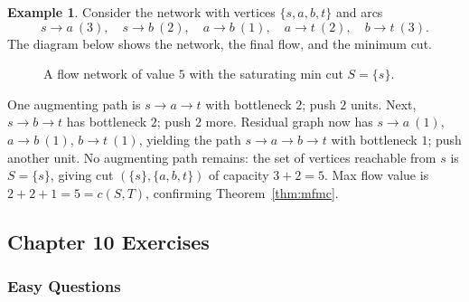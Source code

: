 \documentclass{article}
\theoremstyle{definition}
\newtheorem{example}{Example}
\begin{document}
\begin{example}
Consider the network with vertices $\{s, a, b, t\}$ and arcs
\[
  s \to a\ (3),\quad s \to b\ (2),\quad
  a \to b\ (1),\quad a \to t\ (2),\quad b \to t\ (3).
\]
The diagram below shows the network, the final flow, and the
minimum cut.

\begin{figure}[ht]
\centering
{}
\caption{A flow network of value $5$ with the saturating min cut $S = \{s\}$.}
\label{fig:mfmc-example}
\end{figure}

One augmenting path is $s \to a \to t$ with bottleneck $2$; push $2$
units. Next, $s \to b \to t$ has bottleneck $2$; push $2$ more.
Residual graph now has $s \to a\ (1)$, $a \to b\ (1)$, $b \to t\ (1)$,
yielding the path $s \to a \to b \to t$ with bottleneck $1$; push
another unit. No augmenting path remains: the set of vertices
reachable from $s$ is $S = \{s\}$, giving cut $(\{s\}, \{a, b, t\})$
of capacity $3 + 2 = 5$. Max flow value is $2 + 2 + 1 = 5 = c(S, T)$,
confirming Theorem~\ref{thm:mfmc}.
\end{example}

\subsection{Chapter 10 Exercises}

\subsubsection{Easy Questions}
\end{document}
